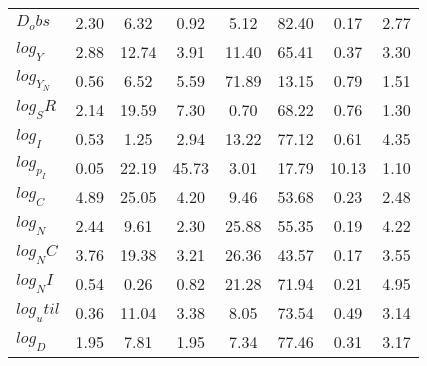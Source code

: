 \begin{center}
\begin{longtable}{lccccccc}
$D_obs     $	 & 	        2.30	 & 	        6.32	 & 	        0.92	 & 	        5.12	 & 	       82.40	 & 	        0.17	 & 	        2.77 \\ 
$log_Y     $	 & 	        2.88	 & 	       12.74	 & 	        3.91	 & 	       11.40	 & 	       65.41	 & 	        0.37	 & 	        3.30 \\ 
$log_Y_N   $	 & 	        0.56	 & 	        6.52	 & 	        5.59	 & 	       71.89	 & 	       13.15	 & 	        0.79	 & 	        1.51 \\ 
$log_SR    $	 & 	        2.14	 & 	       19.59	 & 	        7.30	 & 	        0.70	 & 	       68.22	 & 	        0.76	 & 	        1.30 \\ 
$log_I     $	 & 	        0.53	 & 	        1.25	 & 	        2.94	 & 	       13.22	 & 	       77.12	 & 	        0.61	 & 	        4.35 \\ 
$log_p_I   $	 & 	        0.05	 & 	       22.19	 & 	       45.73	 & 	        3.01	 & 	       17.79	 & 	       10.13	 & 	        1.10 \\ 
$log_C     $	 & 	        4.89	 & 	       25.05	 & 	        4.20	 & 	        9.46	 & 	       53.68	 & 	        0.23	 & 	        2.48 \\ 
$log_N     $	 & 	        2.44	 & 	        9.61	 & 	        2.30	 & 	       25.88	 & 	       55.35	 & 	        0.19	 & 	        4.22 \\ 
$log_NC    $	 & 	        3.76	 & 	       19.38	 & 	        3.21	 & 	       26.36	 & 	       43.57	 & 	        0.17	 & 	        3.55 \\ 
$log_NI    $	 & 	        0.54	 & 	        0.26	 & 	        0.82	 & 	       21.28	 & 	       71.94	 & 	        0.21	 & 	        4.95 \\ 
$log_util  $	 & 	        0.36	 & 	       11.04	 & 	        3.38	 & 	        8.05	 & 	       73.54	 & 	        0.49	 & 	        3.14 \\ 
$log_D     $	 & 	        1.95	 & 	        7.81	 & 	        1.95	 & 	        7.34	 & 	       77.46	 & 	        0.31	 & 	        3.17 \\ 
\end{longtable}
 \end{center}
